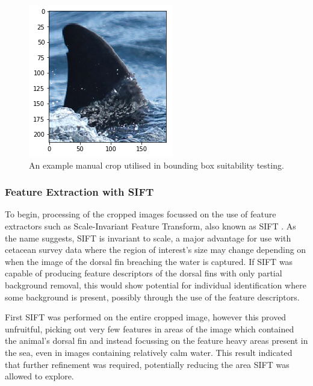 \begin{figure}
	\begin{center}
		\includegraphics[scale=0.6]{Chapter3/figs/manual-crop-example.png}
	\end{center}
	\caption{An example manual crop utilised in bounding box suitability testing.
	}
	\label{fig:manual-crop-example}
\end{figure}

\subsubsection{Feature Extraction with SIFT}\label{ch:cetDet,sec:deciding,sub:boundingBoxInvestigation,subsub:SIFT}

To begin, processing of the cropped images focussed on the use of feature extractors such as Scale-Invariant Feature Transform, also known as SIFT \cite{lowe_object_1999}. As the name suggests, SIFT is invariant to scale, a major advantage for use with cetacean survey data where the region of interest's size may change depending on when the image of the dorsal fin breaching the water is captured. If SIFT was capable of producing feature descriptors of the dorsal fins with only partial background removal, this would show potential for individual identification where some background is present, possibly through the use of the feature descriptors. 

First SIFT was performed on the entire cropped image, however this proved unfruitful, picking out very few features in areas of the image which contained the animal's dorsal fin and instead focussing on the feature heavy areas present in the sea, even in images containing relatively calm water. This result indicated that further refinement was required, potentially reducing the area SIFT was allowed to explore. 

